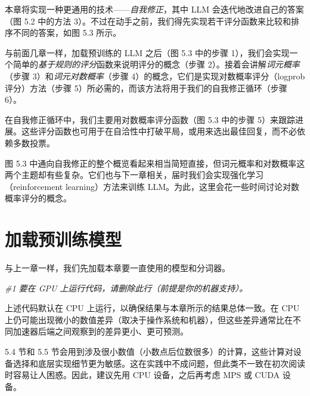 本章将实现一种更通用的技术——\emph{自我修正}，其中 LLM 会迭代地改进自己的答案（图 5.2 中的方法 3）。不过在动手之前，我们得先实现若干评分函数来比较和排序不同的答案，如图 5.3 所示。


与前面几章一样，加载预训练的 LLM 之后（图 5.3 中的步骤 1），我们会实现一个简单的\emph{基于规则的评分}函数来说明评分的概念（步骤 2）。接着会讲解\emph{词元概率}（步骤 3）和\emph{词元对数概率}（步骤 4）的概念，它们是实现对数概率评分（logprob 评分）方法（步骤 5）所必需的，而该方法将用于我们的自我修正循环（步骤 6）。

在自我修正循环中，我们主要用对数概率评分函数（图 5.3 中的步骤 5）来跟踪进展。这些评分函数也可用于在自洽性中打破平局，或用来选出最佳回复，而不必依赖多数投票。

图 5.3 中通向自我修正的整个概览看起来相当简短直接，但词元概率和对数概率这两个主题却有些复杂。它们也与下一章相关，届时我们会实现强化学习（reinforcement learning）方法来训练 LLM。为此，这里会花一些时间讨论对数概率评分的概念。

\section{加载预训练模型}

与上一章一样，我们先加载本章要一直使用的模型和分词器。

{\noindent\small\textit{\#1 要在 GPU 上运行代码，请删除此行（前提是你的机器支持）。}\par}

上述代码默认在 CPU 上运行，以确保结果与本章所示的结果总体一致。在 CPU 上仍可能出现微小的数值差异（取决于操作系统和机器），但这些差异通常比在不同加速器后端之间观察到的差异更小、更可预测。

5.4 节和 5.5 节会用到涉及很小数值（小数点后位数很多）的计算，这些计算对设备选择和底层实现细节更为敏感。这在实践中不成问题，但此类不一致在初次阅读时容易让人困惑。因此，建议先用 CPU 设备，之后再考虑 MPS 或 CUDA 设备。

